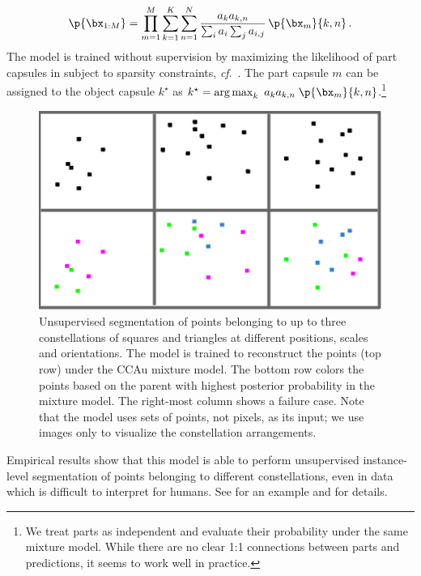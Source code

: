 \begin{equation}
    \p{\bx_{1:M}} = \prod_{m=1}^M \sum_{k=1}^K \sum_{n=1}^{N}  
    \frac{a_k a_{k,n}}{\sum_i a_i \sum_j a_{i,j}}
    \,\p{\bx_m}{k,n}\,. \label{eq:constellation_likelihood}
\end{equation}
The model is trained without supervision by maximizing the likelihood of part capsules in  subject to sparsity constraints, \textit{cf}.\ .
The part capsule $m$ can be assigned to the object capsule $k^\star$ as $k^\star = \operatorname{arg\,max}_{k}~a_k a_{k,n}\;\p{\bx_m}{k,n}$.\footnote{We treat parts as independent and evaluate their probability under the same mixture model. While there are no clear 1:1 connections between parts and predictions, it seems to work well in practice.}
\begin{figure} 
    \centering
    \begin{minipage}[c]{0.35\linewidth}
        \centering
        \includegraphics[width=\linewidth]{figures/SCA/consinvert5}
    \end{minipage}
    \hfill
    \begin{minipage}[c]{0.63\linewidth}
        \centering
        \caption{
            Unsupervised segmentation of points belonging to up to three constellations of squares and triangles at different positions, scales and orientations. 
            The model is trained to reconstruct the points (top row) under the \gls{CCAu} mixture model. The bottom row colors the points based on the parent with highest posterior probability in the mixture model. 
            The right-most column shows a failure case.
            Note that the model uses sets of points, not pixels, as its input; we use images  only to visualize the constellation arrangements.
        }
        \label{fig:constellations}
    \end{minipage}
\end{figure}
Empirical results show that this model is able to perform unsupervised instance-level segmentation of points belonging to different constellations, even in data which is difficult to interpret for humans. See  for an example and  for details.

